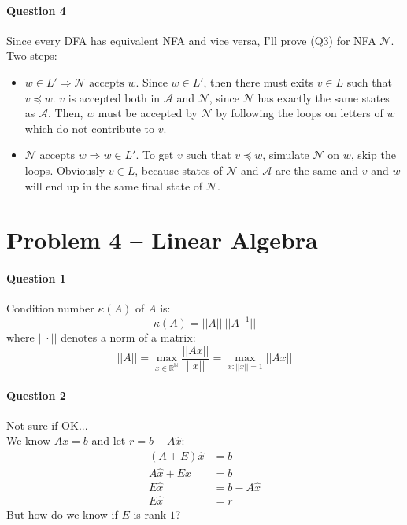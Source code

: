 \paragraph{Question 4}
Since every DFA has equivalent NFA and vice versa, I'll prove (Q3) for NFA $\mathcal{N}$.
Two steps:
\begin{itemize}
    \item $w \in L' \Rightarrow \mathcal{N} \text{ accepts } w$.
    Since $w\in L'$, then there must exits $v\in L$ such that $v\preceq w$.
    $v$ is accepted both in $\mathcal{A}$ and $\mathcal{N}$, since $\mathcal{N}$ has exactly the same states as $\mathcal{A}$.
    Then, $w$ must be accepted by $\mathcal{N}$ by following the loops on letters of $w$ which do not contribute to $v$.
    \item $\mathcal{N} \text{ accepts } w \Rightarrow w \in L'$.
    To get $v$ such that $v\preceq w$, simulate $\mathcal{N}$ on $w$, skip the loops. 
    Obviously $v\in L$, because states of $\mathcal{N}$ and $\mathcal{A}$ are the same and $v$ and $w$ will end up in the same final state of $\mathcal{N}$.
\end{itemize}



\section{Problem 4 – Linear Algebra}

\paragraph{Question 1}
Condition number $\kappa(A)$ of $A$ is:
\begin{equation*}
    \kappa(A) = ||A|| \: ||A^{-1}||
\end{equation*}
where $||\cdot ||$ denotes a norm of a matrix:
\begin{equation*}
    ||A|| = \max_{x\in \mathbb{R^N}} \frac{||Ax||}{||x||} = \max_{x: ||x||=1} ||Ax||
\end{equation*}



\paragraph{Question 2}
Not sure if OK...  \\ We know $Ax = b$ and let $r = b- A\hat{x}$:
\begin{align*}
    (A+E)\hat{x} &= b \\
    A\hat{x} + E\hat{x} &= b \\
    E\hat{x} &= b - A\hat{x} \\
    E\hat{x} &= r
\end{align*}
But how do we know if $E$ is rank $1$?



